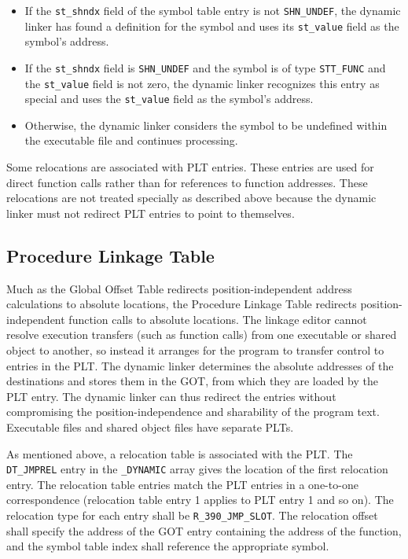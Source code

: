 \documentclass[USenglish,fontsize=11pt,twoside,%
  toc=bib,toc=idx,toc=graduated,numbers=noendperiod,
  bookmarks=true,
  bookmarksnumbered=true,
  bookmarksopen=true,
  bookmarksopenlevel=1,
  breaklinks=true,
  colorlinks=true,
  linkcolor=black,
  pdfpagelayout={TwoPageRight},
  pdfusetitle=true
]{scrreprt}
\begin{document}
\begin{itemize}
\item If the \texttt{st\_shndx} field of the symbol table entry is not
  \texttt{SHN\_UNDEF}, the dynamic linker has found a definition for
  the symbol and uses its \texttt{st\_value} field as the symbol's
  address.
\item If the \texttt{st\_shndx} field is \texttt{SHN\_UNDEF} and the
  symbol is of type \texttt{STT\_FUNC} and the \texttt{st\_value}
  field is not zero, the dynamic linker recognizes this entry as
  special and uses the \texttt{st\_value} field as the symbol's
  address.
\item Otherwise, the dynamic linker considers the symbol to be
  undefined within the executable file and continues processing.
\end{itemize}

Some relocations are associated with PLT entries.  These entries are
used for direct function calls rather than for references to function
addresses.  These relocations are not treated specially as described
above because the dynamic linker must not redirect PLT entries to
point to themselves.

\subsection{Procedure Linkage Table}
\label{procedurelinkagetable}
Much as the Global Offset Table redirects position-independent address
calculations to absolute locations, the Procedure Linkage Table
redirects position-independent function calls to absolute
locations.  The linkage editor cannot resolve execution transfers (such
as function calls) from one executable or shared object to another, so
instead it arranges for the program to transfer control to entries in
the PLT\@.  The dynamic linker determines the absolute addresses of the
destinations and stores them in the GOT, from which they are loaded by
the PLT entry.  The dynamic linker can thus redirect the entries
without compromising the position-independence and sharability of the
program text.  Executable files and shared object files have separate
PLTs.

As mentioned above, a relocation table is associated with the PLT\@.
The \texttt{DT\_JMPREL} entry in the \texttt{\_DYNAMIC} array gives
the location of the first relocation entry.  The relocation table
entries match the PLT entries in a one-to-one correspondence
(relocation table entry 1 applies to PLT entry 1 and so on).  The
relocation type for each entry shall be
\texttt{R\_390\_JMP\_SLOT}.  The relocation offset shall specify the
address of the GOT entry containing the address of the function, and
the symbol table index shall reference the appropriate symbol.
\end{document}
